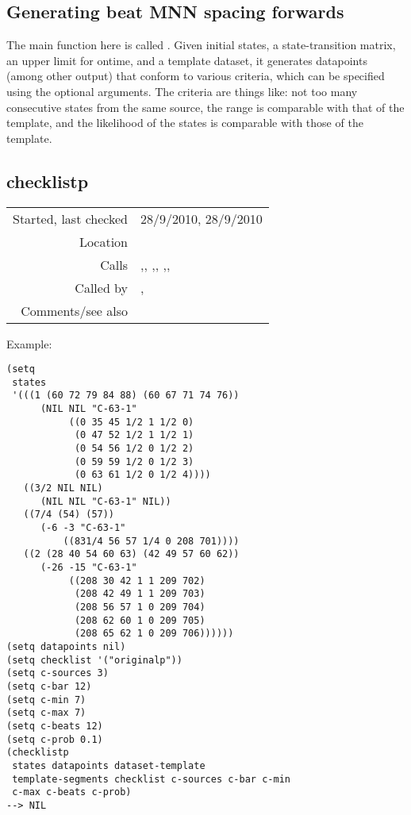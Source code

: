 \subsection{Generating beat MNN spacing forwards}\label{sec:generating-beat-MNN-spacing-forwards}

The main function here is called
. Given initial states, a
state-transition matrix, an upper limit for ontime,
and a template dataset, it generates datapoints (among
other output) that conform to various criteria, which
can be specified using the optional arguments. The
criteria are things like: not too many consecutive
states from the same source, the range is comparable
with that of the template, and the likelihood of the
states is comparable with those of the template.


\subsection*{checklistp}\label{fun:checklistp}

\vspace{0.3cm}
\begin{tabular}{r|p{8cm}}
Started, last checked & 28/9/2010, 28/9/2010 \\
Location & \nameref{sec:generating-beat-MNN-spacing-forwards} \\
Calls & \nameref{fun:comparable-likelihood-profilep},\newline \nameref{fun:index-item-1st-doesnt-occur}, \nameref{fun:lastn},\newline \nameref{fun:mean-and-rangep}, \nameref{fun:my-last},\newline \nameref{fun:pitch-and-octave-spellingp}, \nameref{fun:segments-strict} \\
Called by & \nameref{fun:generate-beat-MNN-spacing->},\newline \nameref{fun:generate-beat-spacing-forcing->} \\
Comments/see also & \nameref{fun:checklist<-p}
\end{tabular}

\vspace{0.5cm}
\noindent Example:
\begin{verbatim}
(setq
 states
 '(((1 (60 72 79 84 88) (60 67 71 74 76))
      (NIL NIL "C-63-1"
           ((0 35 45 1/2 1 1/2 0)
            (0 47 52 1/2 1 1/2 1)
            (0 54 56 1/2 0 1/2 2)
            (0 59 59 1/2 0 1/2 3)
            (0 63 61 1/2 0 1/2 4))))
   ((3/2 NIL NIL)
      (NIL NIL "C-63-1" NIL))
   ((7/4 (54) (57))
      (-6 -3 "C-63-1"
          ((831/4 56 57 1/4 0 208 701))))
   ((2 (28 40 54 60 63) (42 49 57 60 62))
      (-26 -15 "C-63-1"
           ((208 30 42 1 1 209 702)
            (208 42 49 1 1 209 703)
            (208 56 57 1 0 209 704)
            (208 62 60 1 0 209 705)
            (208 65 62 1 0 209 706))))))
(setq datapoints nil)
(setq checklist '("originalp"))
(setq c-sources 3)
(setq c-bar 12)
(setq c-min 7)
(setq c-max 7)
(setq c-beats 12)
(setq c-prob 0.1)
(checklistp
 states datapoints dataset-template
 template-segments checklist c-sources c-bar c-min
 c-max c-beats c-prob)
--> NIL
\end{verbatim}

